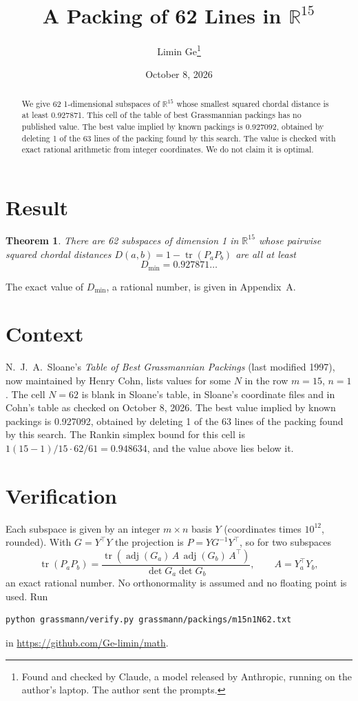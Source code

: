\documentclass[11pt,a4paper]{article}
\title{A Packing of 62 Lines in $\mathbb{R}^{15}$}
\author{Limin Ge\thanks{Found and checked by Claude, a model released by Anthropic, running on the author's laptop. The author sent the prompts.}}
\date{October 8, 2026}
\newtheorem*{theorem}{Theorem}
\begin{document}
\maketitle
\begin{abstract}
We give 62 1-dimensional subspaces of $\mathbb{R}^{15}$ whose smallest squared chordal distance is at least 0.927871. This cell of the table of best Grassmannian packings has no published value. The best value implied by known packings is 0.927092, obtained by deleting 1 of the 63 lines of the packing found by this search. The value is checked with exact rational arithmetic from integer coordinates. We do not claim it is optimal.
\end{abstract}

\section{Result}
\begin{theorem}
There are 62 subspaces of dimension 1 in $\mathbb{R}^{15}$ whose pairwise squared chordal distances $D(a,b) = 1 - \operatorname{tr}(P_aP_b)$ are all at least
\[ D_{\min} = 0.927871\ldots \]
\end{theorem}
The exact value of $D_{\min}$, a rational number, is given in Appendix~A.


\section{Context}
N.~J.~A.~Sloane's \emph{Table of Best Grassmannian Packings} (last modified 1997), now maintained by Henry Cohn, lists values for some $N$ in the row $m=15$, $n=1$. The cell $N=62$ is blank in Sloane's table, in Sloane's coordinate files and in Cohn's table as checked on October 8, 2026. The best value implied by known packings is 0.927092, obtained by deleting 1 of the 63 lines of the packing found by this search. The Rankin simplex bound for this cell is $1(15-1)/15\cdot 62/61 = 0.948634$, and the value above lies below it.


\section{Verification}
Each subspace is given by an integer $m\times n$ basis $Y$ (coordinates times $10^{12}$, rounded). With $G=Y^\top Y$ the projection is $P=YG^{-1}Y^\top$, so for two subspaces
\[ \operatorname{tr}(P_aP_b)=\frac{\operatorname{tr}(\operatorname{adj}(G_a)\,A\,\operatorname{adj}(G_b)\,A^\top)}{\det G_a\det G_b},\qquad A=Y_a^\top Y_b, \]
an exact rational number. No orthonormality is assumed and no floating point is used. Run
\begin{verbatim}
python grassmann/verify.py grassmann/packings/m15n1N62.txt
\end{verbatim}
in \url{https://github.com/Ge-limin/math}.
\end{document}
